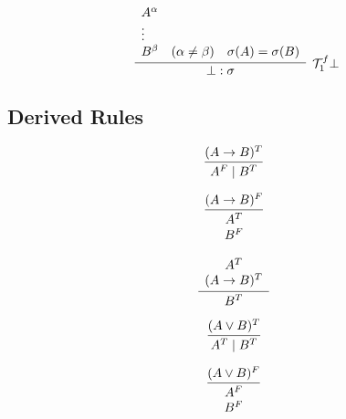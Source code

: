 \noindent
\begin{minipage}{\linewidth}
    \[
        \infer[\mathcal{T}_1^f \bot]{\bot : \sigma}{
            \begin{array}{lll}
                A^\alpha & & \\
                \vdots &  & \\
                B^\beta & (\alpha \neq \beta) & \sigma(A) = \sigma(B)
            \end{array}
        }
    \]
\end{minipage}

\subsection{Derived Rules}

\begin{multicols}{3}
    \noindent
    \begin{minipage}{\linewidth}
        \[
            \infer[]{A^F \mid B^T}{(A \to B)^T}
        \]
    \end{minipage}

    \noindent
    \begin{minipage}{\linewidth}
        \[
            \infer[]{
                \begin{array}{c}
                    A^T \\
                    B^F
                \end{array}
            }{(A \to B)^F}
        \]
    \end{minipage}

    \noindent
    \begin{minipage}{\linewidth}
        \vspace{-0.4cm}
        \[
            \infer[]{B^T}{
                \begin{array}{c}
                    A^T \\
                    (A \to B)^T
                \end{array}
            }
        \]
    \end{minipage}
\end{multicols}

\begin{multicols}{2}
    \noindent
    \begin{minipage}{\linewidth}
        \[
            \infer[]{A^T \mid B^T}{(A \lor B)^T}
        \]
    \end{minipage}

    \noindent
    \begin{minipage}{\linewidth}
        \[
            \infer[]{
                \begin{array}{c}
                    A^F \\
                    B^F
                \end{array}
            }{(A \lor B)^F}
        \]
    \end{minipage}
\end{multicols}

